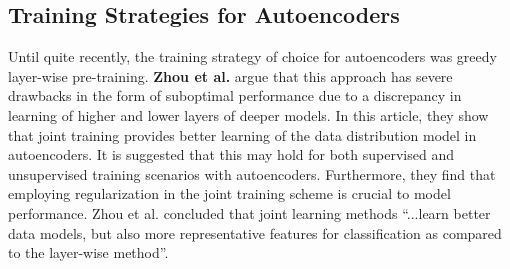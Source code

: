 \subsection{Training Strategies for Autoencoders} \label{sec:trainae}
Until quite recently, the training strategy of choice for autoencoders was greedy layer-wise pre-training. 
\textbf{Zhou et al.}\autocite{Zhou2014} argue that this approach has severe drawbacks in the form of suboptimal performance due to a discrepancy in learning of higher and lower layers of deeper models.
In this article, they show that joint training provides better learning of the data distribution model in autoencoders. 
It is suggested that this may hold for both supervised and unsupervised training scenarios with autoencoders. 
Furthermore, they find that employing regularization in the joint training scheme is crucial to model performance. 
Zhou et al. concluded that joint learning methods “...learn better data models, but also more representative features for classification as compared to the layer-wise method”.



